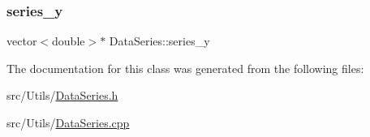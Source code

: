 \mbox{\label{classDataSeries_a4a8cff07f177a4787904ed1cd746bf23_a4a8cff07f177a4787904ed1cd746bf23}} 
\subsubsection{\texorpdfstring{series\+\_\+y}{series\_y}}
{\footnotesize\ttfamily vector$<$double$>$$\ast$ Data\+Series\+::series\+\_\+y\hspace{0.3cm}{\ttfamily [private]}}



The documentation for this class was generated from the following files\+:\begin{DoxyCompactItemize}
\item 
src/\+Utils/\mbox{\hyperlink{DataSeries_8h}{Data\+Series.\+h}}\item 
src/\+Utils/\mbox{\hyperlink{DataSeries_8cpp}{Data\+Series.\+cpp}}\end{DoxyCompactItemize}
